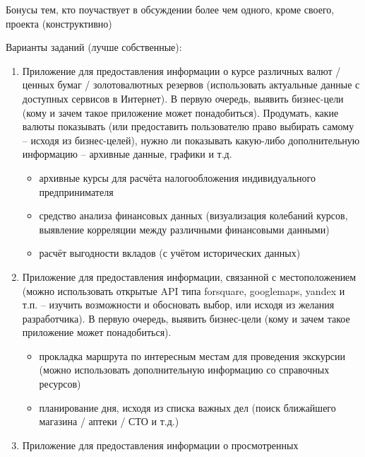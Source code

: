 \documentclass[12pt, a4paper]{article}
\begin{document}
\noindent
Бонусы тем, кто поучаствует в обсуждении более чем одного, кроме своего, проекта (конструктивно) \newline

\newpage
\noindent
Варианты заданий (лучше собственные):

\begin{enumerate} \itemsep0em
    \item Приложение для предоставления информации о курсе различных
          валют / ценных бумаг / золотовалютных резервов (использовать
          актуальные данные с доступных сервисов в Интернет). В первую
          очередь, выявить бизнес-цели (кому и зачем такое приложение
          может понадобиться). Продумать, какие валюты показывать (или
          предоставить пользователю право выбирать самому – исходя из
          бизнес-целей), нужно ли показывать какую-либо дополнительную
          информацию – архивные данные, графики и т.д.
          \begin{itemize} \itemsep0em
              \item архивные курсы для расчёта налогообложения индивидуального
                    предпринимателя
              \item средство анализа финансовых данных (визуализация колебаний
                    курсов, выявление корреляции между различными финансовыми
                    данными)
              \item расчёт выгодности вкладов (с учётом исторических данных)
          \end{itemize}
    \item Приложение для предоставления информации, связанной с
          местоположением (можно использовать открытые API типа
          forsquare, googlemaps, yandex и т.п. – изучить возможности и
          обосновать выбор, или исходя из желания разработчика). В первую
          очередь, выявить бизнес-цели (кому и зачем такое приложение
          может понадобиться).
          \begin{itemize} \itemsep0em
              \item прокладка маршрута по интересным местам для проведения
                    экскурсии (можно использовать дополнительную информацию со
                    справочных ресурсов)
              \item планирование дня, исходя из списка важных дел (поиск ближайшего
                    магазина / аптеки / СТО и т.д.)
          \end{itemize}
    \item Приложение для предоставления информации о просмотренных

\end{enumerate}
\end{document}
